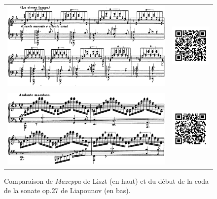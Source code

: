 \begin{figure}[!p]
  \begin{bigcenter}
    \begin{tabular}{lr}
      \vspace*{0.0cm}
      \includegraphics[width=12.5cm, keepaspectratio]{mazeppa.png}
      &
      \includegraphics[width=3cm, keepaspectratio]{mazeppa-qr.png}
      \\
      \vspace{0.5cm} &
      \\
      \includegraphics[width=12.5cm, keepaspectratio]{sonate-coda.png}
      &
      \includegraphics[width=3cm, keepaspectratio]{sonate-qr.png}
    \end{tabular}
  \end{bigcenter}
  \caption{\label{sonate-coda}Comparaison de \emph{Mazeppa} de Liszt (en haut) et du début de la coda de la sonate op.27 de Liapounov (en bas).}
\end{figure}

